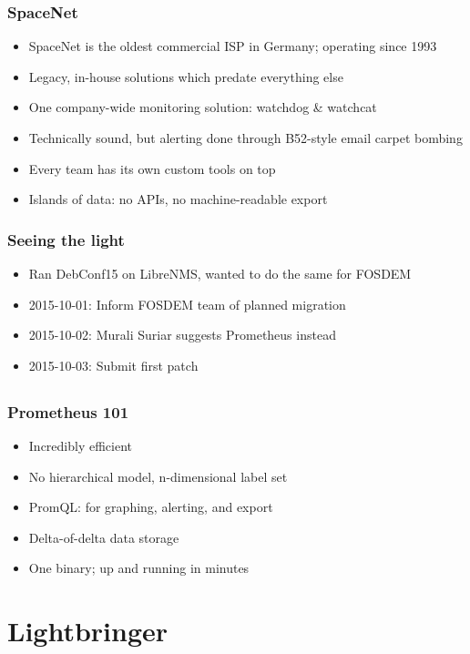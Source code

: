 \documentclass[t]{beamer}
\begin{document}
\begin{frame}
	\frametitle{SpaceNet}
	\begin{itemize}
		\item SpaceNet is the oldest commercial ISP in Germany; operating since 1993
		\item Legacy, in-house solutions which predate everything else
		\item One company-wide monitoring solution: watchdog \& watchcat
		\item Technically sound, but alerting done through B52-style email carpet bombing
		\item Every team has its own custom tools on top
		\item Islands of data: no APIs, no machine-readable export
	\end{itemize}
\end{frame}

\begin{frame}
	\frametitle{Seeing the light}
	\begin{itemize}
		\item Ran DebConf15 on LibreNMS, wanted to do the same for FOSDEM
		\item 2015-10-01: Inform FOSDEM team of planned migration
		\item 2015-10-02: Murali Suriar suggests Prometheus instead
		\item 2015-10-03: Submit first patch
	\end{itemize}
\end{frame}

\subsection{}

\begin{frame}
	\frametitle{Prometheus 101}
	\begin{itemize}
		\item Incredibly efficient
		\item No hierarchical model, n-dimensional label set
		\item PromQL: for graphing, alerting, and export
		\item Delta-of-delta data storage
		\item One binary; up and running in minutes
	\end{itemize}
\end{frame}




\section{Lightbringer}
\end{document}
